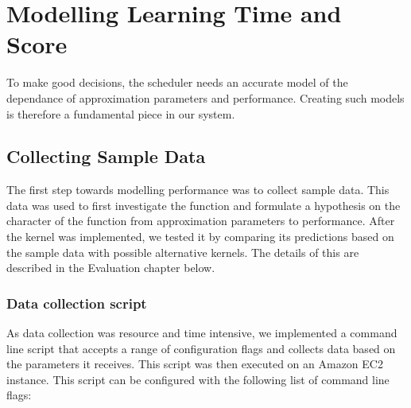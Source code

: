 \documentclass[a4paper,12pt,twoside,openright]{report}
\begin{document}








\chapter{Modelling Learning Time and Score}
To make good decisions, the scheduler needs an accurate model of the dependance of approximation parameters and performance. Creating such models is therefore a fundamental piece in our system.

\section{Collecting Sample Data}
The first step towards modelling performance was to collect sample data. This data was used to first investigate the function and formulate a hypothesis on the character of the function from approximation parameters to performance. After the kernel was implemented, we tested it by comparing its predictions based on the sample data with possible alternative kernels. The details of this are described in the Evaluation chapter below.

\subsection{Data collection script}
As data collection was resource and time intensive, we implemented a command line script that accepts a range of configuration flags and collects data based on the parameters it receives. This script was then executed on an Amazon EC2 instance. This script can be configured with the following list of command line flags:
\end{document}

